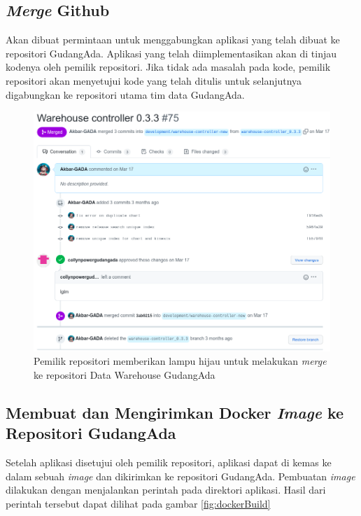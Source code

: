 \subsection{\textit{Merge} Github}
\label{sec:merge}

Akan dibuat permintaan untuk menggabungkan aplikasi yang telah dibuat ke repositori GudangAda. Aplikasi yang telah diimplementasikan akan di tinjau kodenya oleh pemilik repositori. Jika tidak ada masalah pada kode, pemilik repositori akan menyetujui kode yang telah ditulis untuk selanjutnya digabungkan ke repositori utama tim data GudangAda.

\begin{figure}
	\centering
	\includegraphics[width=1\textwidth]{pics/wc-lgtm.png}
	\caption{Pemilik repositori memberikan lampu hijau untuk melakukan \textit{merge} ke repositori Data Warehouse GudangAda}
	\label{fig:wcLGTM}
\end{figure}

\subsection{Membuat dan Mengirimkan Docker \textit{Image} ke Repositori GudangAda}
\label{sec:uploadDocker}

Setelah aplikasi disetujui oleh pemilik repositori, aplikasi dapat di kemas ke dalam sebuah \textit{image} dan dikirimkan ke repositori GudangAda. Pembuatan \textit{image} dilakukan dengan menjalankan perintah  pada direktori aplikasi. Hasil dari perintah tersebut dapat dilihat pada gambar \ref{fig:dockerBuild}

